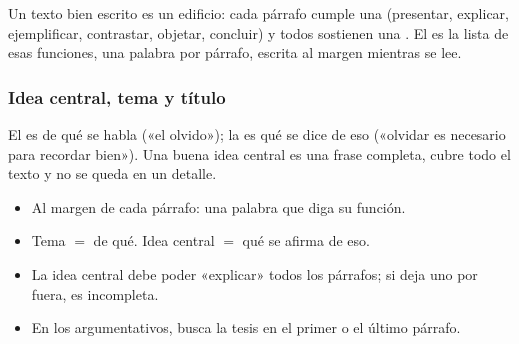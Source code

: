 Un texto bien escrito es un edificio: cada párrafo cumple una  (presentar, explicar, ejemplificar,
contrastar, objetar, concluir) y todos sostienen una . El  es la lista de esas
funciones, una palabra por párrafo, escrita al margen mientras se lee.


\subsubsection{Idea central, tema y título}
El  es de qué se habla («el olvido»); la  es qué se dice de eso («olvidar es necesario para
recordar bien»). Una buena idea central es una frase completa, cubre todo el texto y no se queda en un detalle.

\begin{regla}
\begin{itemize}
  \item Al margen de cada párrafo: una palabra que diga su función.
  \item Tema $=$ de qué. Idea central $=$ qué se afirma de eso.
  \item La idea central debe poder «explicar» todos los párrafos; si deja uno por fuera, es incompleta.
  \item En los argumentativos, busca la tesis en el primer o el último párrafo.
\end{itemize}
\end{regla}

